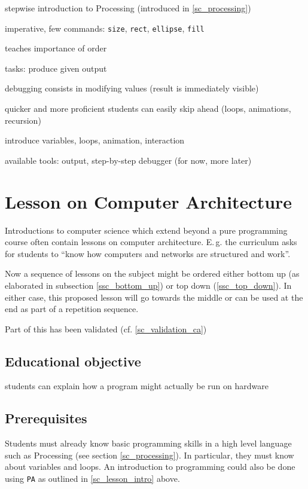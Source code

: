 \begin{todo}
\item stepwise introduction to Processing (introduced in \ref{sc_processing})
\item imperative, few commands: \texttt{size}, \texttt{rect}, \texttt{ellipse}, \texttt{fill}
\item teaches importance of order
\item tasks: produce given output
\item debugging consists in modifying values (result is immediately visible)
\item quicker and more proficient students can easily skip ahead (loops, animations, recursion)
\item introduce variables, loops, animation, interaction
\item available tools: output, step-by-step debugger (for now, more later)
\end{todo}



\section{Lesson on Computer Architecture} \label{sc_lesson_ca}
Introductions to computer science which extend beyond a pure programming course often contain lessons on computer architecture. E.\,g. the curriculum \cite[p.\,145]{Erz16} asks for students to ``know how computers and networks are structured and work''.

Now a sequence of lessons on the subject might be ordered either bottom up (as elaborated in subsection \ref{ssc_bottom_up}) or top down (\ref{ssc_top_down}). In either case, this proposed lesson will go towards the middle or can be used at the end as part of a repetition sequence.

Part of this has been validated (cf. \ref{sc_validation_ca})


\subsection{Educational objective}

\begin{todo}
\item students can explain how a program might actually be run on hardware
\end{todo}


\subsection{Prerequisites}
Students must already know basic programming skills in a high level language such as Processing (see section \ref{sc_processing}). In particular, they must know about variables and loops. An introduction to programming could also be done using \texttt{PA} as outlined in \ref{sc_lesson_intro} above.

